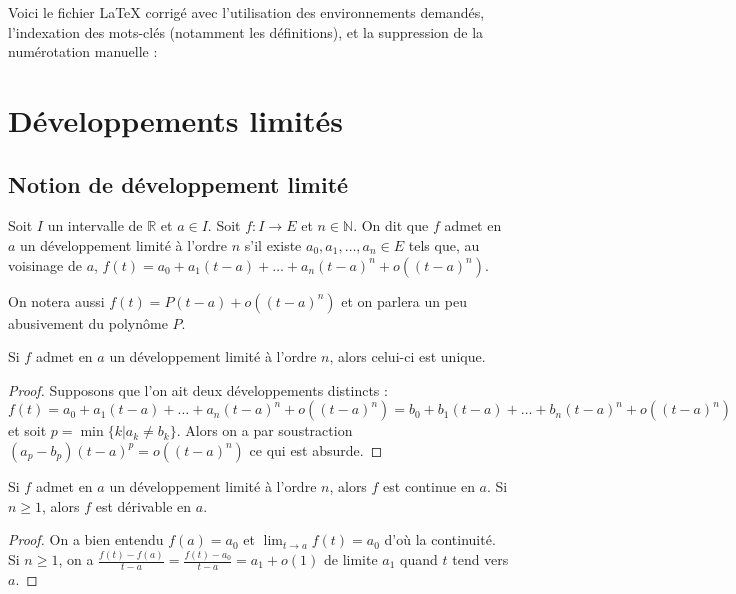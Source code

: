 Voici le fichier LaTeX corrigé avec l'utilisation des environnements demandés, l'indexation des mots-clés (notamment les définitions), et la suppression de la numérotation manuelle :

\section{Développements limités}

\subsection{Notion de développement limité}

\begin{de}
Soit $I$ un intervalle de $\mathbb{R}$ et $a \in I$. Soit $f : I \rightarrow E$ et $n \in \mathbb{N}$. On dit que $f$ admet en $a$ un développement limité à l'ordre $n$ s'il existe $a_0, a_1, \ldots, a_n \in E$ tels que, au voisinage de $a$, $f(t) = a_0 + a_1(t - a) + \ldots + a_n(t - a)^n + o((t - a)^n)$.
\end{de}

\begin{rem}
On notera aussi $f(t) = P(t - a) + o((t - a)^n)$ et on parlera un peu abusivement du polynôme $P$.
\end{rem}

\begin{prop}
Si $f$ admet en $a$ un développement limité à l'ordre $n$, alors celui-ci est unique.
\end{prop}

\begin{proof}
Supposons que l'on ait deux développements distincts : $f(t) = a_0 + a_1(t-a) + \ldots + a_n(t-a)^n + o((t-a)^n) = b_0 + b_1(t-a) + \ldots + b_n(t-a)^n + o((t-a)^n)$ et soit $p = \min\{k | a_k \neq b_k\}$. Alors on a par soustraction $(a_p - b_p)(t - a)^p = o((t - a)^n)$ ce qui est absurde.
\end{proof}

\begin{prop}
Si $f$ admet en $a$ un développement limité à l'ordre $n$, alors $f$ est continue en $a$. Si $n \geq 1$, alors $f$ est dérivable en $a$.
\end{prop}

\begin{proof}
On a bien entendu $f(a) = a_0$ et $\lim_{t \rightarrow a} f(t) = a_0$ d'où la continuité. Si $n \geq 1$, on a $\frac{f(t)-f(a)}{t-a} = \frac{f(t)-a_0}{t-a} = a_1 + o(1)$ de limite $a_1$ quand $t$ tend vers $a$.
\end{proof}

